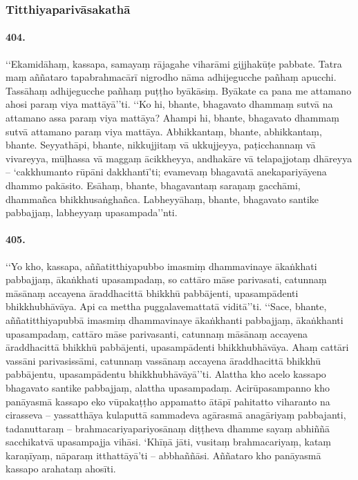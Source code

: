 \subsubsection{Titthiyaparivāsakathā}

\paragraph{404.} ‘‘Ekamidāhaṃ, kassapa, samayaṃ rājagahe viharāmi gijjhakūṭe pabbate. Tatra maṃ aññataro tapabrahmacārī nigrodho nāma adhijegucche pañhaṃ apucchi. Tassāhaṃ adhijegucche pañhaṃ puṭṭho byākāsiṃ. Byākate ca pana me attamano ahosi paraṃ viya mattāyā’’ti. ‘‘Ko hi, bhante, bhagavato dhammaṃ sutvā na attamano assa paraṃ viya mattāya? Ahampi hi, bhante, bhagavato dhammaṃ sutvā attamano paraṃ viya mattāya. Abhikkantaṃ, bhante, abhikkantaṃ, bhante. Seyyathāpi, bhante, nikkujjitaṃ vā ukkujjeyya, paṭicchannaṃ vā vivareyya, mūḷhassa vā maggaṃ ācikkheyya, andhakāre vā telapajjotaṃ dhāreyya – ‘cakkhumanto rūpāni dakkhantī’ti; evamevaṃ bhagavatā anekapariyāyena dhammo pakāsito. Esāhaṃ, bhante, bhagavantaṃ saraṇaṃ gacchāmi, dhammañca bhikkhusaṅghañca. Labheyyāhaṃ, bhante, bhagavato santike pabbajjaṃ, labheyyaṃ upasampada’’nti.

\paragraph{405.} ‘‘Yo kho, kassapa, aññatitthiyapubbo imasmiṃ dhammavinaye ākaṅkhati pabbajjaṃ, ākaṅkhati upasampadaṃ, so cattāro māse parivasati, catunnaṃ māsānaṃ accayena āraddhacittā bhikkhū pabbājenti, upasampādenti bhikkhubhāvāya. Api ca mettha puggalavemattatā viditā’’ti. ‘‘Sace, bhante, aññatitthiyapubbā imasmiṃ dhammavinaye ākaṅkhanti pabbajjaṃ, ākaṅkhanti upasampadaṃ, cattāro māse parivasanti, catunnaṃ māsānaṃ accayena āraddhacittā bhikkhū pabbājenti, upasampādenti bhikkhubhāvāya. Ahaṃ cattāri vassāni parivasissāmi, catunnaṃ vassānaṃ accayena āraddhacittā bhikkhū pabbājentu, upasampādentu bhikkhubhāvāyā’’ti. Alattha kho acelo kassapo bhagavato santike pabbajjaṃ, alattha upasampadaṃ. Acirūpasampanno kho panāyasmā kassapo eko vūpakaṭṭho appamatto ātāpī pahitatto viharanto na cirasseva – yassatthāya kulaputtā sammadeva agārasmā anagāriyaṃ pabbajanti, tadanuttaraṃ – brahmacariyapariyosānaṃ diṭṭheva dhamme sayaṃ abhiññā sacchikatvā upasampajja vihāsi. ‘Khīṇā jāti, vusitaṃ brahmacariyaṃ, kataṃ karaṇīyaṃ, nāparaṃ itthattāyā’ti – abbhaññāsi. Aññataro kho panāyasmā kassapo arahataṃ ahosīti.

